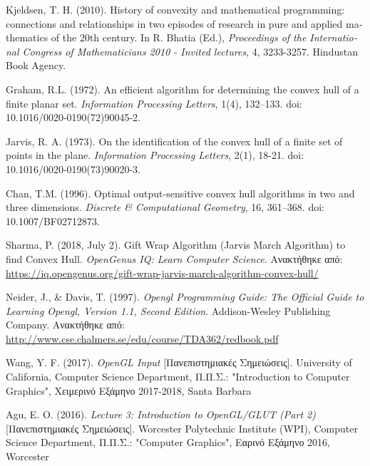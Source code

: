 \begin{thebibliography}{16}
\vspace{2.5em}


 \textlatin{Kjeldsen, T. H. (2010). History of convexity and mathematical programming: connections and relationships in two episodes of research in pure and applied mathematics of the 20th century. In R. Bhatia (Ed.), \emph{Proceedings of the International Congress of Mathematicians 2010 - Invited lectures}, 4, 3233-3257. Hindustan Book Agency.}

 \textlatin{Graham, R.L. (1972). An efficient algorithm for determining the convex hull of a finite planar set. \emph{Information Processing Letters}, 1(4), 132–133. doi: 10.1016/0020-0190(72)90045-2.}

 \textlatin{Jarvis, R. A. (1973). On the identification of the convex hull of a finite set of points in the plane. \emph{Information Processing Letters}, 2(1), 18-21. doi: 10.1016/0020-0190(73)90020-3.}

 \textlatin{Chan, T.M. (1996). Optimal output-sensitive convex hull algorithms in two and three dimensions. \emph{Discrete \& Computational Geometry}, 16, 361–368. doi: 10.1007/BF02712873.}

 \textlatin{Sharma, P. (2018, July 2). Gift Wrap Algorithm (Jarvis March Algorithm) to find Convex Hull. \emph{OpenGenus IQ: Learn Computer Science}}. Ανακτήθηκε από: \textlatin{\url{https://iq.opengenus.org/gift-wrap-jarvis-march-algorithm-convex-hull/}}

 \textlatin{Neider, J., \& Davis, T. (1997). \emph{Opengl Programming Guide: The Official Guide to Learning Opengl, Version 1.1, Second Edition}. Addison-Wesley Publishing Company.} Ανακτήθηκε από: \textlatin{\url{http://www.cse.chalmers.se/edu/course/TDA362/redbook.pdf}}

 \textlatin{Wang, Y. F. (2017). \emph{OpenGL Input}} [Πανεπιστημιακές Σημειώσεις]. \textlatin{University of California, Computer Science Department}, Π.Π.Σ.: \textlatin{"Introduction to Computer Graphics"}, Χειμερινό Εξάμηνο 2017-2018, \textlatin{Santa Barbara}

 \textlatin{Agu, E. O. (2016). \emph{Lecture 3: Introduction to OpenGL/GLUT (Part 2)}} [Πανεπιστημιακές Σημειώσεις]. \textlatin{Worcester Polytechnic Institute (WPI), Computer Science Department}, Π.Π.Σ.: \textlatin{"Computer Graphics"}, Εαρινό Εξάμηνο 2016, \textlatin{Worcester}

\end{thebibliography}
